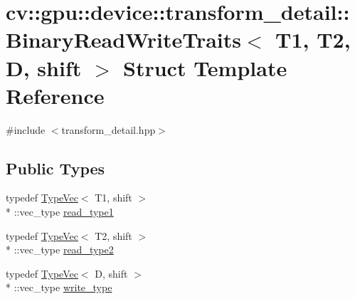 \hypertarget{structcv_1_1gpu_1_1device_1_1transform__detail_1_1BinaryReadWriteTraits}{\section{cv\-:\-:gpu\-:\-:device\-:\-:transform\-\_\-detail\-:\-:Binary\-Read\-Write\-Traits$<$ T1, T2, D, shift $>$ Struct Template Reference}
\label{structcv_1_1gpu_1_1device_1_1transform__detail_1_1BinaryReadWriteTraits}
}


{\ttfamily \#include $<$transform\-\_\-detail.\-hpp$>$}

\subsection*{Public Types}
\begin{DoxyCompactItemize}
\item 
typedef \hyperlink{structcv_1_1gpu_1_1device_1_1TypeVec}{Type\-Vec}$<$ T1, shift $>$\\*
\-::vec\-\_\-type \hyperlink{structcv_1_1gpu_1_1device_1_1transform__detail_1_1BinaryReadWriteTraits_a8174c130d50b5ef07f583f0ce6307d50}{read\-\_\-type1}
\item 
typedef \hyperlink{structcv_1_1gpu_1_1device_1_1TypeVec}{Type\-Vec}$<$ T2, shift $>$\\*
\-::vec\-\_\-type \hyperlink{structcv_1_1gpu_1_1device_1_1transform__detail_1_1BinaryReadWriteTraits_abfa1dd86230812afe07c3af47bf9bb2f}{read\-\_\-type2}
\item 
typedef \hyperlink{structcv_1_1gpu_1_1device_1_1TypeVec}{Type\-Vec}$<$ D, shift $>$\\*
\-::vec\-\_\-type \hyperlink{structcv_1_1gpu_1_1device_1_1transform__detail_1_1BinaryReadWriteTraits_afc503c7273d80dd10dd4ba7af5f91df9}{write\-\_\-type}
\end{DoxyCompactItemize}


